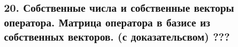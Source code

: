 {
\subsection{20.	Собственные числа и собственные векторы оператора. Матрица оператора в базисе из собственных векторов. (с доказательсвом) ???}
}